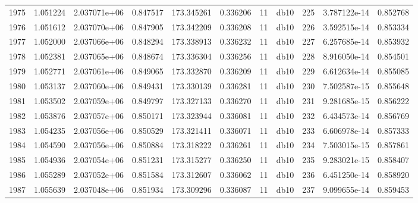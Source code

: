 \begin{tabular}{lrrrrrrlrrr}
1975 &    1.051224 &        2.037071e+06 &  0.847517 &              173.345261 &    0.336206 &      11 &         db10 &    225 &   3.787122e-14 &      0.852768 \\
1976 &    1.051612 &        2.037070e+06 &  0.847905 &              173.342209 &    0.336208 &      11 &         db10 &    226 &   3.592515e-14 &      0.853334 \\
1977 &    1.052000 &        2.037066e+06 &  0.848294 &              173.338913 &    0.336232 &      11 &         db10 &    227 &   6.257685e-14 &      0.853932 \\
1978 &    1.052381 &        2.037065e+06 &  0.848674 &              173.336304 &    0.336256 &      11 &         db10 &    228 &   8.916050e-14 &      0.854501 \\
1979 &    1.052771 &        2.037061e+06 &  0.849065 &              173.332870 &    0.336209 &      11 &         db10 &    229 &   6.612634e-14 &      0.855085 \\
1980 &    1.053137 &        2.037060e+06 &  0.849431 &              173.330139 &    0.336281 &      11 &         db10 &    230 &   7.502587e-15 &      0.855648 \\
1981 &    1.053502 &        2.037059e+06 &  0.849797 &              173.327133 &    0.336270 &      11 &         db10 &    231 &   9.281685e-15 &      0.856222 \\
1982 &    1.053876 &        2.037057e+06 &  0.850171 &              173.323944 &    0.336081 &      11 &         db10 &    232 &   6.434573e-14 &      0.856769 \\
1983 &    1.054235 &        2.037056e+06 &  0.850529 &              173.321411 &    0.336071 &      11 &         db10 &    233 &   6.606978e-14 &      0.857333 \\
1984 &    1.054590 &        2.037056e+06 &  0.850884 &              173.318222 &    0.336261 &      11 &         db10 &    234 &   7.503015e-15 &      0.857861 \\
1985 &    1.054936 &        2.037054e+06 &  0.851231 &              173.315277 &    0.336250 &      11 &         db10 &    235 &   9.283021e-15 &      0.858407 \\
1986 &    1.055289 &        2.037052e+06 &  0.851584 &              173.312607 &    0.336062 &      11 &         db10 &    236 &   6.451250e-14 &      0.858920 \\
1987 &    1.055639 &        2.037048e+06 &  0.851934 &              173.309296 &    0.336087 &      11 &         db10 &    237 &   9.099655e-14 &      0.859453 \\

\end{tabular}
